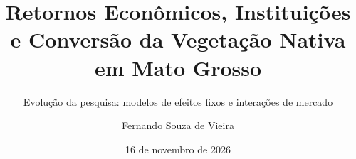 \documentclass[aspectratio=169,10.5pt]{beamer}
\title[Efeitos Fixos e Interações de Mercado]{Retornos Econômicos, Instituições e Conversão da Vegetação Nativa em Mato Grosso}
\subtitle{Evolução da pesquisa: modelos de efeitos fixos e interações de mercado}
\author{Fernando Souza de Vieira}
\institute{Tópicos em Microeconomia Aplicada}
\date{16 de novembro de 2026}
\begin{document}
\begin{frame}
\titlepage
\end{frame}
\end{document}
